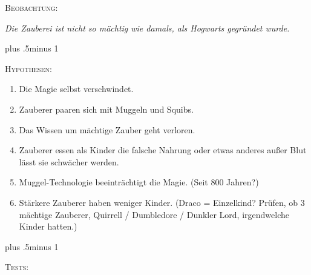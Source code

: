 \begin{centering}
\nopagebreak
\scshape Beobachtung:

\itshape Die Zauberei ist nicht so mächtig wie damals, als Hogwarts gegründet wurde.

\baselineskip plus .5\textheight minus 1\baselineskip

\scshape Hypothesen:

\nopagebreak
\itshape
 \begin{enumerate}[1.]
 \firmlist
 \setlength{\leftmargin}{\parindent}
 \setlength{\rightmargin}{\parindent}
 \item Die Magie selbst verschwindet.
 \item Zauberer paaren sich mit Muggeln und Squibs.
 \item Das Wissen um mächtige Zauber geht verloren.
 \item Zauberer essen als Kinder die falsche Nahrung oder etwas anderes außer Blut lässt sie schwächer werden.
 \item Muggel-Technologie beeinträchtigt die Magie. (Seit 800 Jahren?)
 \item Stärkere Zauberer haben weniger Kinder. (Draco = Einzelkind? Prüfen, ob 3 mächtige Zauberer, Quirrell / Dumbledore / Dunkler Lord, irgendwelche Kinder hatten.)
 \end{enumerate}

\baselineskip plus .5\textheight minus 1\baselineskip

\scshape Tests:


\end{centering}
